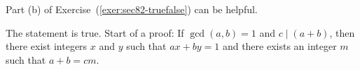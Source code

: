 \begin{list}{\bf{\ref{exer:24divides-nsquaredminus1}.}}
\item Part (b) of Exercise~(\ref{exer:sec82-truefalse}) can be helpful.
\end{list}


\begin{list}{\bf{\ref{exer:cdividessum}.}}
\item The statement is true.  Start of a proof:  If   $\gcd ( {a, b} ) = 1$  and  
$c \mid ( {a + b} )$, then there exist integers $x$ and $y$ such that 
$ax + by = 1$ and there exists an integer $m$ such that $a + b = cm$.  
\end{list}
\hbreak
\pagebreak
\endinput


